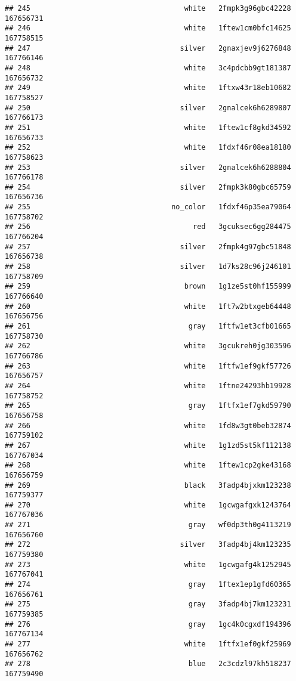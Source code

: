\documentclass[
]{article}
\begin{document}
\begin{verbatim}
## 245                                    white   2fmpk3g96gbc42228 167656731
## 246                                    white   1ftew1cm0bfc14625 167758515
## 247                                   silver   2gnaxjev9j6276848 167766146
## 248                                    white   3c4pdcbb9gt181387 167656732
## 249                                    white   1ftxw43r18eb10682 167758527
## 250                                   silver   2gnalcek6h6289807 167766173
## 251                                    white   1ftew1cf8gkd34592 167656733
## 252                                    white   1fdxf46r08ea18180 167758623
## 253                                   silver   2gnalcek6h6288804 167766178
## 254                                   silver   2fmpk3k80gbc65759 167656736
## 255                                 no_color   1fdxf46p35ea79064 167758702
## 256                                      red   3gcuksec6gg284475 167766204
## 257                                   silver   2fmpk4g97gbc51848 167656738
## 258                                   silver   1d7ks28c96j246101 167758709
## 259                                    brown   1g1ze5st0hf155999 167766640
## 260                                    white   1ft7w2btxgeb64448 167656756
## 261                                     gray   1ftfw1et3cfb01665 167758730
## 262                                    white   3gcukreh0jg303596 167766786
## 263                                    white   1ftfw1ef9gkf57726 167656757
## 264                                    white   1ftne24293hb19928 167758752
## 265                                     gray   1ftfx1ef7gkd59790 167656758
## 266                                    white   1fd8w3gt0beb32874 167759102
## 267                                    white   1g1zd5st5kf112138 167767034
## 268                                    white   1ftew1cp2gke43168 167656759
## 269                                    black   3fadp4bjxkm123238 167759377
## 270                                    white   1gcwgafgxk1243764 167767036
## 271                                     gray   wf0dp3th0g4113219 167656760
## 272                                   silver   3fadp4bj4km123235 167759380
## 273                                    white   1gcwgafg4k1252945 167767041
## 274                                     gray   1ftex1ep1gfd60365 167656761
## 275                                     gray   3fadp4bj7km123231 167759385
## 276                                     gray   1gc4k0cgxdf194396 167767134
## 277                                    white   1ftfx1ef0gkf25969 167656762
## 278                                     blue   2c3cdzl97kh518237 167759490

\end{verbatim}
\end{document}
